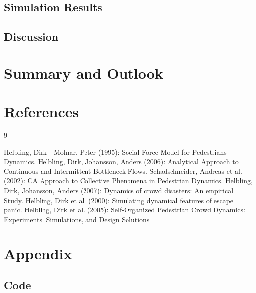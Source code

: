 \documentclass[11pt]{article}
\begin{document}
\subsection{Simulation Results}

\subsection{Discussion}


\section{Summary and Outlook}


\section{References}

\begin{thebibliography} {9}
	
	 Helbling, Dirk - Molnar, Peter (1995): Social Force Model for Pedestrians Dynamics.
	 Helbling, Dirk, Johansson, Anders (2006): Analytical Approach to Continuous and Intermittent Bottleneck Flows.
	 Schadschneider, Andreas et al. (2002): CA Approach to Collective Phenomena in Pedestrian Dynamics.	
	 Helbling, Dirk, Johansson, Anders (2007): Dynamics of crowd disasters: An empirical Study.
	 Helbling, Dirk et al. (2000): Simulating dynamical features of escape panic.
	 Helbling, Dirk et al. (2005): Self-Organized Pedestrian Crowd Dynamics: Experiments, Simulations, and Design Solutions

\end{thebibliography}


\section{Appendix}

\subsection{Code}

\lstset{language=Matlab,breaklines=true}
\end{document}
